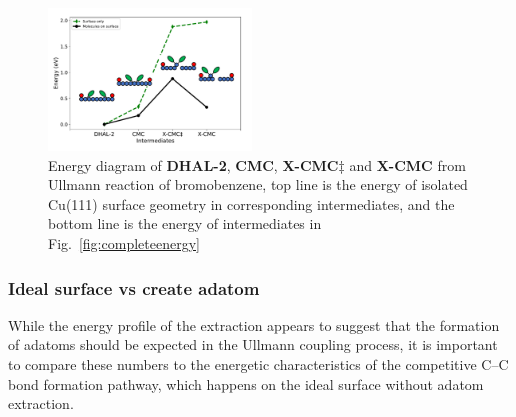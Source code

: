 \documentclass[%
 reprint,
 amsmath,amssymb,
 aps,
prb,
floatfix,
]{revtex4-2}
\newcommand{\lock}{\color{red}}
\newcommand{\lock}{\color{red}}
\begin{document}


\begin{figure}[hbt]
\centering
\includegraphics[width=0.48\textwidth]{Fig/onlysurface.pdf}
\caption{Energy diagram of \textbf{DHAL-2}, \textbf{CMC}, \textbf{X-CMC$\ddagger$} and \textbf{X-CMC} from Ullmann reaction of bromobenzene, top line is the energy of isolated Cu(111) surface geometry in corresponding intermediates, and the bottom line is the energy of intermediates in Fig.~\ref{fig:completeenergy}}
\label{fig:onlysurface}
\end{figure}



\subsubsection{Ideal surface vs create adatom}

{\lock
While the energy profile of the extraction appears to suggest that the formation of adatoms should be expected in the Ullmann coupling process, it is important to compare these numbers to the energetic characteristics of the competitive C--C bond formation pathway, which happens on the ideal surface without adatom extraction. 


}
\end{document}
